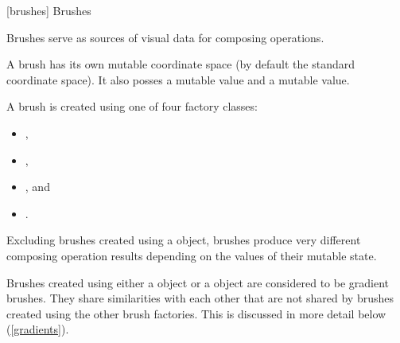 
 [brushes] {Brushes}

\pnum
Brushes serve as sources of visual data for composing operations.

\pnum
A brush has its own mutable coordinate space (by default the standard coordinate space). It also posses a mutable  value and a mutable  value.

\pnum
A brush is created using one of four factory classes:
\begin{itemize}
\item {},
\item {},
\item {}, and
\item {}.
\end{itemize}

\pnum
Excluding brushes created using a  object, brushes produce very different composing operation results depending on the values of their mutable state.

\pnum
Brushes created using either a  object or a  object are considered to be gradient brushes. They share similarities with each other that are not shared by brushes created using the other brush factories. This is discussed in more detail below (\ref{gradients}).

\addtocounter{SectionDepthBase}{1}









\addtocounter{SectionDepthBase}{-1}
